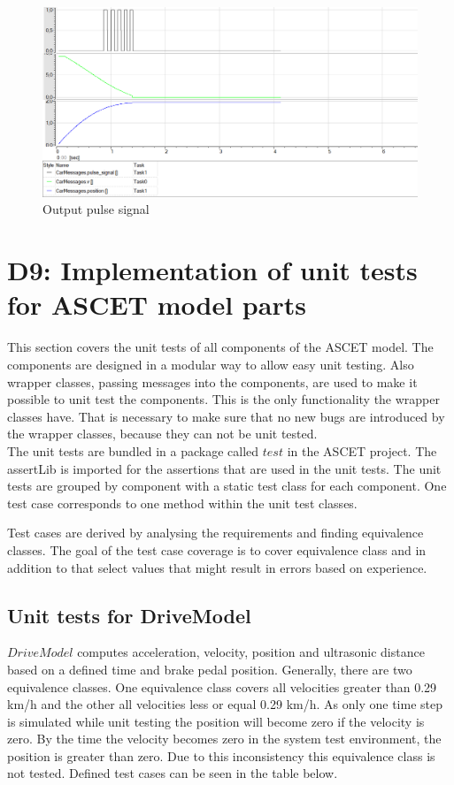 \begin{figure}[H]
\centering
\includegraphics[width=1\textwidth]{images/ascet_pulsesignal.png}
\caption{Output pulse signal}
\label{fig:BlockdiagrammPulseSignalOutput}
\end{figure}

\chapter{D9: Implementation of unit tests for ASCET model parts}\label{cha:D9}
This section covers the unit tests of all components of the ASCET model.
The components are designed in a modular way to allow easy unit testing.
Also wrapper classes, passing messages into the components, are used to make it possible to unit test the components.
This is the only functionality the wrapper classes have.
That is necessary to make sure that no new bugs are introduced by the wrapper classes, because they can not be unit tested.\\
The unit tests are bundled in a package called $test$ in the ASCET project. The assertLib is imported for the assertions that are used in the unit tests. The unit tests are grouped by component with a static test class for each component. One test case corresponds to one method within the unit test classes.

Test cases are derived by analysing the requirements and finding equivalence classes.
The goal of the test case coverage is to cover equivalence class and in addition to that select values that might result in errors based on experience.

\section{Unit tests for DriveModel}

$DriveModel$ computes acceleration, velocity, position and ultrasonic distance based on a defined time and brake pedal position. Generally, there are two equivalence classes. One equivalence class covers all velocities greater than 0.29 km/h and the other all velocities less or equal 0.29 km/h. As only one time step is simulated while unit testing the position will become zero if the velocity is zero. By the time the velocity becomes zero in the system test environment, the position is greater than zero. Due to this inconsistency this equivalence class is not tested. Defined test cases can be seen in the table below.

